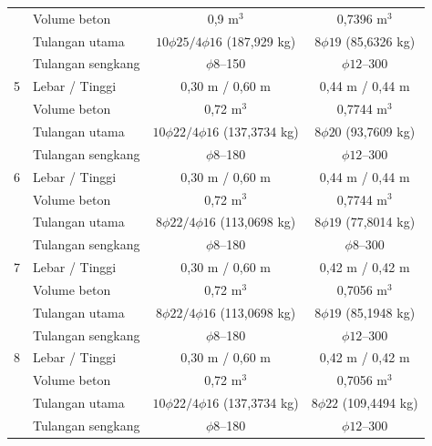 \begin{landscape}
\begin{longtable}{clcccc}
  & Volume beton & \multicolumn{2}{c}{0,9 m$^3$} & \multicolumn{2}{c}{0,7396 m$^3$} \\
  & Tulangan utama & \multicolumn{2}{c}{$10\phi25/4\phi16$ (187,929 kg)} & \multicolumn{2}{c}{$8\phi19$ (85,6326 kg)} \\
  & Tulangan sengkang & \multicolumn{2}{c}{$\phi8$--150} & \multicolumn{2}{c}{$\phi12$--300} \\
5 & Lebar / Tinggi & \multicolumn{2}{c}{0,30 m / 0,60 m} & \multicolumn{2}{c}{0,44 m / 0,44 m} \\
  & Volume beton & \multicolumn{2}{c}{0,72 m$^3$} & \multicolumn{2}{c}{0,7744 m$^3$} \\
  & Tulangan utama & \multicolumn{2}{c}{$10\phi22/4\phi16$ (137,3734 kg)} & \multicolumn{2}{c}{$8\phi20$ (93,7609 kg)} \\
  & Tulangan sengkang & \multicolumn{2}{c}{$\phi8$--180} & \multicolumn{2}{c}{$\phi12$--300} \\
6 & Lebar / Tinggi & \multicolumn{2}{c}{0,30 m / 0,60 m} & \multicolumn{2}{c}{0,44 m / 0,44 m} \\
  & Volume beton & \multicolumn{2}{c}{0,72 m$^3$} & \multicolumn{2}{c}{0,7744 m$^3$} \\
  & Tulangan utama & \multicolumn{2}{c}{$8\phi22/4\phi16$ (113,0698 kg)} & \multicolumn{2}{c}{$8\phi19$ (77,8014 kg)} \\
  & Tulangan sengkang & \multicolumn{2}{c}{$\phi8$--180} & \multicolumn{2}{c}{$\phi8$--300} \\
7 & Lebar / Tinggi & \multicolumn{2}{c}{0,30 m / 0,60 m} & \multicolumn{2}{c}{0,42 m / 0,42 m} \\
  & Volume beton & \multicolumn{2}{c}{0,72 m$^3$} & \multicolumn{2}{c}{0,7056 m$^3$} \\
  & Tulangan utama & \multicolumn{2}{c}{$8\phi22/4\phi16$ (113,0698 kg)} & \multicolumn{2}{c}{$8\phi19$ (85,1948 kg)} \\
  & Tulangan sengkang & \multicolumn{2}{c}{$\phi8$--180} & \multicolumn{2}{c}{$\phi12$--300} \\
8 & Lebar / Tinggi & \multicolumn{2}{c}{0,30 m / 0,60 m} & \multicolumn{2}{c}{0,42 m / 0,42 m} \\
  & Volume beton & \multicolumn{2}{c}{0,72 m$^3$} & \multicolumn{2}{c}{0,7056 m$^3$} \\
  & Tulangan utama & \multicolumn{2}{c}{$10\phi22/4\phi16$ (137,3734 kg)} & \multicolumn{2}{c}{$8\phi22$ (109,4494 kg)} \\
  & Tulangan sengkang & \multicolumn{2}{c}{$\phi8$--180} & \multicolumn{2}{c}{$\phi12$--300} \\

\end{longtable}
\end{landscape}
